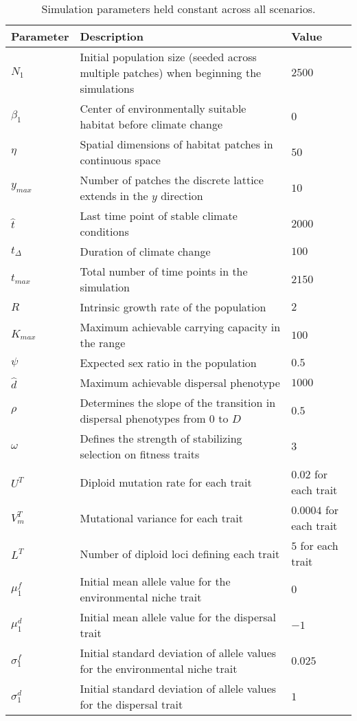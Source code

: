\documentclass[11pt]{article}
\begin{document}
\begin{table}
\renewcommand{\arraystretch}{1.5}
  \begin{tabular}{ p{2cm} | p{8cm} | p{2cm} }
    \hline
    Parameter & Description & Value \\ \hline \hline
    $N_{1}$ & Initial population size (seeded across multiple patches) when beginning the simulations & $2500$ \\
    $\beta_{1}$ & Center of environmentally suitable habitat before climate change & $0$ \\
    $\eta$ & Spatial dimensions of habitat patches in continuous space & $50$ \\
    $y_{max}$ & Number of patches the discrete lattice extends in the $y$ direction & $10$ \\
    $\hat{t}$ & Last time point of stable climate conditions & $2000$ \\
    $t_{\Delta}$ & Duration of climate change & $100$ \\
    $t_{max}$ & Total number of time points in the simulation & $2150$ \\
    $R$ & Intrinsic growth rate of the population & $2$ \\
    $K_{max}$ & Maximum achievable carrying capacity in the range & $100$ \\ 
    $\psi$ & Expected sex ratio in the population & $0.5$ \\
    $\hat{d}$ & Maximum achievable dispersal phenotype & $1000$ \\
    $\rho$ & Determines the slope of the transition in dispersal phenotypes from $0$ to $D$ & $0.5$ \\
    $\omega$ & Defines the strength of stabilizing selection on fitness traits & $3$ \\
    $U^{T}$ & Diploid mutation rate for each trait & $0.02$ for each trait \\
    $V_{m}^{T}$ & Mutational variance for each trait & $0.0004$ for each trait \\
    $L^{T}$ & Number of diploid loci defining each trait & $5$ for each trait \\
    $\mu_{1}^{f}$ & Initial mean allele value for the environmental niche trait & $0$ \\
    $\mu_{1}^{d}$ & Initial mean allele value for the dispersal trait & $-1$ \\
    $\sigma_{1}^{f}$ & Initial standard deviation of allele values for the environmental niche trait & $0.025$ \\
    $\sigma_{1}^{d}$ & Initial standard deviation of allele values for the dispersal trait & $1$ \\
    \hline
  \end{tabular}
\caption[LoF entry]{Simulation parameters held constant across all scenarios.}
\label{table:ConstPars}
\end{table}
\end{document}
